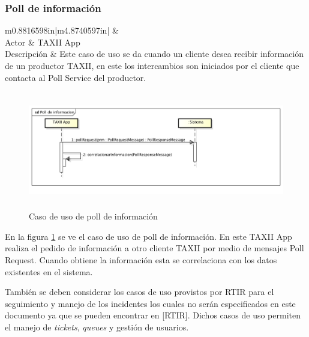 \subsubsection{Poll de información}
\begin{flushleft}
	\tablefirsthead{}
	\tablehead{}
	\tabletail{}
	\tablelasttail{}
	\begin{supertabular}{m{0.8816598in}|m{4.8740597in}|}
		 &
		\\\hline
		{ Actor} &
		{ TAXII App}\\
		{ Descripción} &
		{ Este caso de uso se da cuando un cliente desea recibir información de un
			productor TAXII, en este los intercambios son iniciados por el cliente que contacta al Poll Service del
			productor.}\\\hhline{~-}
	\end{supertabular}
\end{flushleft}

\bigskip
\begin{figure}
	\centering  \includegraphics[width=5.7638in,height=2.0154in]{Analisis22-img/Analisis22-img030.png}
	\caption{Caso de uso de poll de
		información}
	\label{fig.pollinfo}
\end{figure}
{
	En la figura \ref{fig.pollinfo} se ve el caso de uso de poll de información. En este TAXII App realiza el pedido de información a otro
	cliente TAXII por medio de mensajes Poll Request. Cuando obtiene la información esta se correlaciona con los datos
	existentes en el sistema.}


\bigskip


\bigskip

{
	También se deben considerar los casos de uso provistos por RTIR para el seguimiento y manejo de los incidentes los
	cuales no serán especificados en este documento ya que se pueden encontrar en \foreignlanguage{spanish}{[RTIR]}. Dichos
	casos de uso permiten el manejo de \textit{tickets}, \textit{queues }y gestión de usuarios. }

